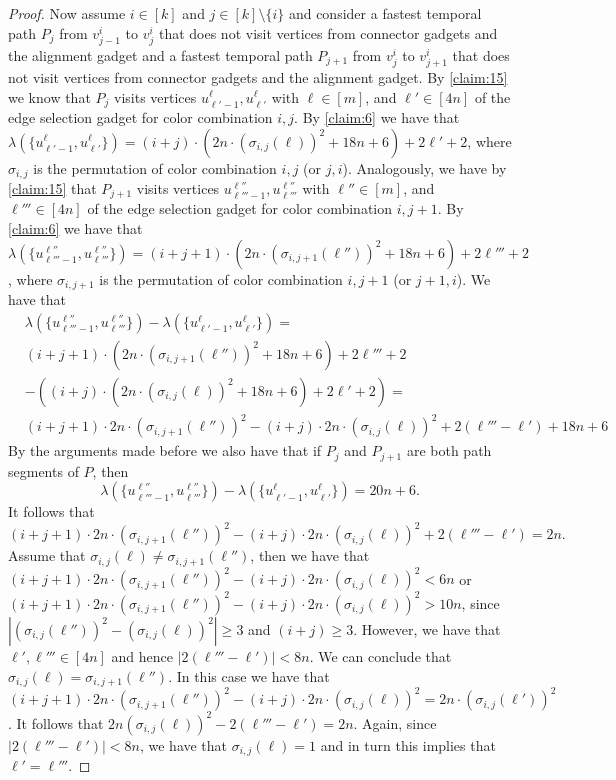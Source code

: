 \documentclass[a4paper,UKenglish,cleveref, autoref, thm-restate]{lipics-v2021}
\begin{document}
\begin{proof}
Now assume $i\in[k]$ and $j\in[k]\setminus\{i\}$ and consider a fastest temporal path $P_j$ from $v_{j-1}^i$ to $v_j^i$ that does not visit vertices from connector gadgets and the alignment gadget and a fastest temporal path $P_{j+1}$ from $v_{j}^i$ to $v_{j+1}^i$ that does not visit vertices from connector gadgets and the alignment gadget. 
By \cref{claim:15} we know that $P_j$ visits vertices $u^\ell_{\ell'-1},u^\ell_{\ell'}$ with $\ell\in[m]$, and $\ell'\in[4n]$ of the edge selection gadget for color combination $i,j$. 
By \cref{claim:6} we have that $\lambda(\{u^\ell_{\ell'-1},u^\ell_{\ell'}\})=(i+j)\cdot (2n\cdot (\sigma_{i,j}(\ell))^2 +18n+6)+2\ell'+2$, where $\sigma_{i,j}$ is the permutation of color combination $i,j$ (or $j,i$).
Analogously, we have by \cref{claim:15} that $P_{j+1}$ visits vertices $u^{\ell''}_{\ell'''-1},u^{\ell''}_{\ell'''}$ with $\ell''\in[m]$, and $\ell'''\in[4n]$ of the edge selection gadget for color combination $i,j+1$. 
By \cref{claim:6} we have that $\lambda(\{u^{\ell''}_{\ell'''-1},u^{\ell''}_{\ell'''}\})=(i+j+1)\cdot (2n\cdot (\sigma_{i,j+1}(\ell''))^2 +18n+6)+2\ell'''+2$, where $\sigma_{i,j+1}$ is the permutation of color combination $i,j+1$ (or $j+1,i$). We have that 
\begin{align*}
& \lambda(\{u^{\ell''}_{\ell'''-1},u^{\ell''}_{\ell'''}\})-\lambda(\{u^\ell_{\ell'-1},u^\ell_{\ell'}\}) = \\
& (i+j+1)\cdot (2n\cdot (\sigma_{i,j+1}(\ell''))^2 +18n+6)+2\ell'''+2\\
& -((i+j)\cdot (2n\cdot (\sigma_{i,j}(\ell))^2 +18n+6)+2\ell'+2) = \\
& (i+j+1)\cdot 2n\cdot (\sigma_{i,j+1}(\ell''))^2 - (i+j)\cdot 2n\cdot (\sigma_{i,j}(\ell))^2 + 2(\ell'''-\ell') + 18n + 6
\end{align*}
By the arguments made before we also have that if $P_j$ and $P_{j+1}$ are both path segments of $P$, then 
\[
\lambda(\{u^{\ell''}_{\ell'''-1},u^{\ell''}_{\ell'''}\})-\lambda(\{u^\ell_{\ell'-1},u^\ell_{\ell'}\}) = 20n+6.
\]
It follows that 
\[
(i+j+1)\cdot 2n\cdot (\sigma_{i,j+1}(\ell''))^2 - (i+j)\cdot 2n\cdot (\sigma_{i,j}(\ell))^2 + 2(\ell'''-\ell') = 2n.
\]
Assume that $\sigma_{i,j}(\ell)\neq \sigma_{i,j+1}(\ell'')$, then we have that $(i+j+1)\cdot 2n\cdot (\sigma_{i,j+1}(\ell''))^2 - (i+j)\cdot 2n\cdot (\sigma_{i,j}(\ell))^2<6n$ or $(i+j+1)\cdot 2n\cdot (\sigma_{i,j+1}(\ell''))^2 - (i+j)\cdot 2n\cdot (\sigma_{i,j}(\ell))^2>10n$, since $|(\sigma_{i,j}(\ell''))^2-(\sigma_{i,j}(\ell))^2|\ge 3$ and $(i+j)\ge 3$. However, we have that $\ell',\ell'''\in[4n]$ and hence $|2(\ell'''-\ell')|< 8n$. We can conclude that $\sigma_{i,j}(\ell)= \sigma_{i,j+1}(\ell'')$.
In this case we have that $(i+j+1)\cdot 2n\cdot (\sigma_{i,j+1}(\ell''))^2 - (i+j)\cdot 2n\cdot (\sigma_{i,j}(\ell))^2= 2n\cdot (\sigma_{i,j}(\ell'))^2$.
It follows that $2n(\sigma_{i,j}(\ell))^2-2(\ell'''-\ell')=2n$. Again, since $|2(\ell'''-\ell')|< 8n$, we have that $\sigma_{i,j}(\ell)=1$ and in turn this implies that $\ell'=\ell'''$.


\end{proof}
\end{document}
